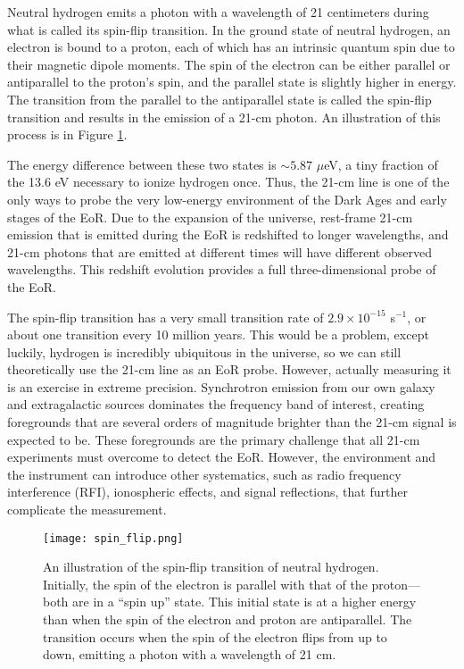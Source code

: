 \documentclass[12pt]{article}
\begin{document}
Neutral hydrogen emits a photon with a wavelength of 21 centimeters during what is called its spin-flip transition. In the ground state of neutral hydrogen, an electron is bound to a proton, each of which has an intrinsic quantum spin due to their magnetic dipole moments. The spin of the electron can be either parallel or antiparallel to the proton's spin, and the parallel state is slightly higher in energy. The transition from the parallel to the antiparallel state is called the spin-flip transition and results in the emission of a 21-cm photon. An illustration of this process is in Figure \ref{fig:spin_flip}.

The energy difference between these two states is $\sim 5.87$ $\mu$eV, a tiny fraction of the 13.6 eV necessary to ionize hydrogen once. Thus, the 21-cm line is one of the only ways to probe the very low-energy environment of the Dark Ages and early stages of the EoR. Due to the expansion of the universe, rest-frame 21-cm emission that is emitted during the EoR is redshifted to longer wavelengths, and 21-cm photons that are emitted at different times will have different observed wavelengths. This redshift evolution provides a full three-dimensional probe of the EoR.

The spin-flip transition has a very small transition rate of $2.9 \times 10^{-15}$ s$^{-1}$, or about one transition every 10 million years. This would be a problem, except luckily, hydrogen is incredibly ubiquitous in the universe, so we can still theoretically use the 21-cm line as an EoR probe. However, actually measuring it is an exercise in extreme precision. Synchrotron emission from our own galaxy and extragalactic sources dominates the frequency band of interest, creating foregrounds that are several orders of magnitude brighter than the 21-cm signal is expected to be. These foregrounds are the primary challenge that all 21-cm experiments must overcome to detect the EoR. However, the environment and the instrument can introduce other systematics, such as radio frequency interference (RFI), ionospheric effects, and signal reflections, that further complicate the measurement. \vspace{3mm}

\begin{figure}[t]
	\centering
	\texttt{[image: spin\_flip.png]}
	\caption[The spin-flip transition of neutral hydrogen]{An illustration of the spin-flip transition of neutral hydrogen. Initially, the spin of the electron is parallel with that of the proton---both are in a ``spin up'' state. This initial state is at a higher energy than when the spin of the electron and proton are antiparallel. The transition occurs when the spin of the electron flips from up to down, emitting a photon with a wavelength of 21 cm.}
	\label{fig:spin_flip}
\end{figure}
\end{document}
